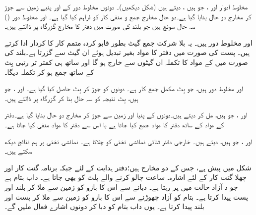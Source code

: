  مخلوط ادوار  اور   ، جو  ہیں  ، دیتے ہیں (شکل  دیکھیں)۔ دونوں مخلوط دور کے  اور  پنیے زمین سے جوڑ کر   مخارج دو حال بنایا گیا ہے۔دو حال مخارج جمع و منفی کار کو فراہم کیا گیا ہے۔  اور  مخلوط دور ()     سہ حال    سوئچ  ہیں جو بلند  کی صورت میں دفتر  کا مخارج   گزرگاہ پر ڈالتے ہیں۔

 اور  مخلوط دور  ہیں۔ یہ بلا شرکت جمع گیٹ بطور قابو  کردہ  متمم کار  کا کردار ادا کرتے ہیں۔ پست  کی صورت میں  دفتر  کا مواد بغیر تبدیل ہوئے ان  گیٹ سے گزرتا ہے۔بلند  کی صورت میں   کے مواد کا  تکملہ   ان گیٹوں سے خارج ہو گا اور ساتھ ہی کمتر تر  رتبی بِٹ کے ساتھ  جمع ہو کر تکملہ  دیگا۔

 اور  مخلوط دور  ہیں، جو  بِٹ  مکمل جمع کار ہے۔ دونوں کو جوڑ کر   بِٹ  حاصل کیا گیا ہے۔  اور ، جو  ہیں،  بِٹ نتیجہ کو سہ حال بنا کر   گزرگاہ پر ڈالتے ہیں۔

 اور ، جو  ہیں، مل کر  دیتے ہیں۔دونوں کے پنیا  اور  زمین سے جوڑ کر مخارج دو حال بنایا گیا ہے۔دفتر   کے مواد کے ساتھ  دفتر  کا مواد جمع کیا جاتا ہے یا اس سے دفتر  کا مواد  منفی کیا جاتا ہے۔

 اور  ، جو  ہیں،  دیتے ہیں۔ خارجی دفتر ثنائی  نمائشی تختی کو  چلاتا ہے۔ نمائشی تختی پر ہم نتائج دیکھ سکتے ہیں۔

شکل  میں  پیش ہے، جس کے دو مخارج ہیں؛دفتر  ہدایت  کے لئے   جبکہ برنامہ گنت کار اور چھلا گنت کار کے لئے  اشارہ۔  ساعت چالو کرنے والے پلٹ  کو بھی جاتا ہے۔  داب بتام ہے جو د آزاد حالت میں  پر رہتا ہے۔ دبانے سے  اس کا بازو       کو زمین سے ملا کر بلند  اور پست  پیدا کرتا ہے۔ بتام کو آزاد چھوڑنے سے اس کا بازو  کو زمین سے ملا کر پست  اور بلند  پیدا کرتا ہے۔ یوں داب  بتام  کو دبا کر دونوں اشارے فعال  ملیں گے۔

